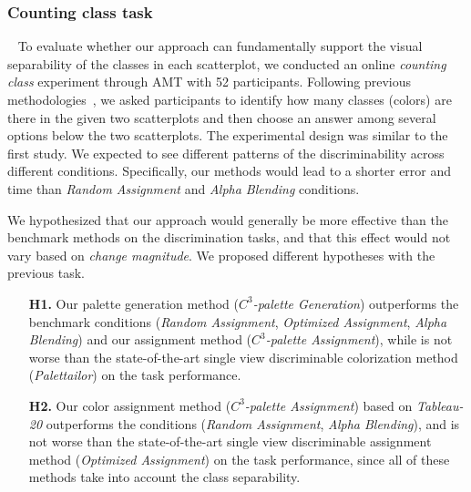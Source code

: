 {\subsubsection{Counting class task}
\
\newline
To evaluate whether our approach can fundamentally support the visual separability of the classes in each scatterplot, we conducted an online \emph{counting class} experiment through AMT with 52 participants. Following previous methodologies~\cite{Wang2018, Lu21}, we asked participants to identify how many classes (colors) are there in the given two scatterplots and then choose an answer among several options below the two scatterplots. The experimental design was similar to the first study.
We expected to see different patterns of the discriminability across different conditions. Specifically, our methods would lead to a shorter error and time than \emph{Random Assignment} and \emph{Alpha Blending} conditions.

\vspace{.3em}
 We hypothesized that our approach would generally be more effective than the benchmark methods on the discrimination tasks, and that this effect would not vary based on \emph{change magnitude}. %
We proposed different hypotheses with the previous task.
\begin{itemize}[noitemsep]
\setlength{\itemsep}{5pt}
    \item[\textbf{H1.}] Our palette generation method (\emph{$C^3$-palette Generation}) outperforms the benchmark conditions (\emph{Random Assignment}, \emph{Optimized Assignment}, \emph{Alpha Blending}) and our assignment method (\emph{$C^3$-palette Assignment}), while is not worse than the state-of-the-art single view discriminable colorization method (\emph{Palettailor}) on the task performance.

    \item [\textbf{H2.}] Our color assignment method (\emph{$C^3$-palette Assignment}) based on \emph{Tableau-20} outperforms the conditions (\emph{Random Assignment}, \emph{Alpha Blending}), and is not worse than the state-of-the-art single view discriminable assignment method (\emph{Optimized Assignment}) on the task performance, since all of these methods take into account the class separability.



\end{itemize}}
